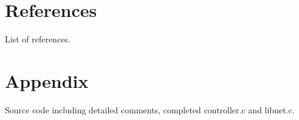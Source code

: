 \documentclass{article}
\begin{document}
\section*{References}
List of references.

\section*{Appendix}
Source code including detailed comments, completed controller.c and libnet.c.
\end{document}
